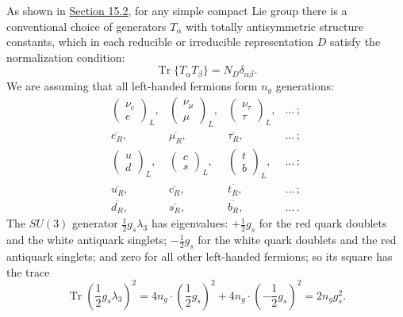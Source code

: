 As shown in \hyperref[sec:15.2]{Section 15.2}, for any simple compact Lie group there is a conventional choice of generators $T_\alpha$ with totally antisymmetric structure constants, which in each reducible or irreducible representation $D$ satisfy the normalization condition:
\begin{equation}
\operatorname{Tr}\{T_\alpha T_\beta\}=N_D\delta_{\alpha\beta}.
\tag{21.5.1}\label{eq:21.5.1}
\end{equation}
We are assuming that all left-handed fermions form $n_g$ generations:
\[
\begin{array}{cccccc}
\begin{pmatrix}\nu_e\\ e\end{pmatrix}_{\!L},
&
\begin{pmatrix}\nu_\mu\\ \mu\end{pmatrix}_{\!L},
&
\begin{pmatrix}\nu_\tau\\ \tau\end{pmatrix}_{\!L},
&
\ldots\,;
\\[7pt]
\overline{e_R},
&
\overline{\mu_R},
&
\overline{\tau_R},
&
\ldots\,;
\\[7pt]
\begin{pmatrix}u\\ d\end{pmatrix}_{\!L},
&
\begin{pmatrix}c\\ s\end{pmatrix}_{\!L},
&
\begin{pmatrix}t\\ b\end{pmatrix}_{\!L},
&
\ldots\,;
\\[7pt]
\overline{u_R},
&
\overline{c_R},
&
\overline{t_R},
&
\ldots\,;
\\[7pt]
\overline{d_R},
&
\overline{s_R},
&
\overline{b_R},
&
\ldots\,.
\end{array}
\]
The $SU(3)$ generator $\frac{1}{2}g_s\lambda_3$ has eigenvalues: $+\frac{1}{2}g_s$ for the red quark doublets and the white antiquark singlets; $-\frac{1}{2}g_s$ for the white quark doublets and the red antiquark singlets; and zero for all other left-handed fermions; so its square has the trace
\begin{equation}
\operatorname{Tr}\left(\frac{1}{2}g_s\lambda_3\right)^2
=4n_g\cdot\left(\frac{1}{2}g_s\right)^2
+4n_g\cdot\left(-\frac{1}{2}g_s\right)^2
=2n_gg_s^2.
\tag{21.5.2}\label{eq:21.5.2}
\end{equation}
